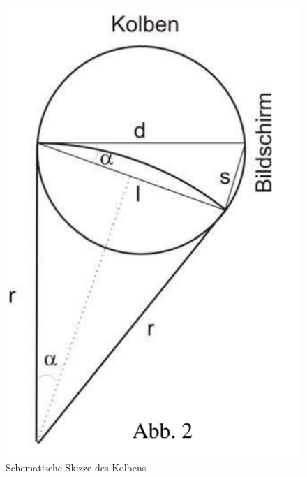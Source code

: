 \documentclass[ngerman]{scrartcl}
\begin{document}
\setcapindent{0pt}
\begin{minipage}[t]{0.35\linewidth}
    \begin{figure}[H]
        \centering
        \includegraphics[width=\linewidth]{fig/Kolben_skizze.png}
        \caption[Kolben Skizze]{Schematische Skizze des Kolbens}
        \label{fig:kolben_skizze}
    \end{figure}
\end{minipage}%
\hspace*{\fill}
\end{document}
